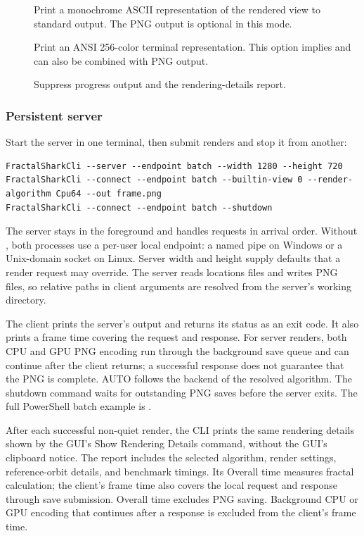 \begin{description}
  \item[]
    Print a monochrome ASCII representation of the rendered view to standard
    output. The PNG output is optional in this mode.

  \item[]
    Print an ANSI 256-color terminal representation. This option implies
     and can also be combined with PNG output.

  \item[]
    Suppress progress output and the rendering-details report.
\end{description}

\subsubsection*{Persistent server}

Start the server in one terminal, then submit renders and stop it from another:

\begin{lstlisting}
FractalSharkCli --server --endpoint batch --width 1280 --height 720
FractalSharkCli --connect --endpoint batch --builtin-view 0 --render-algorithm Cpu64 --out frame.png
FractalSharkCli --connect --endpoint batch --shutdown
\end{lstlisting}

The server stays in the foreground and handles requests in arrival order.
Without , both processes use a per-user local endpoint:
a named pipe on Windows or a Unix-domain socket on Linux. Server width and
height supply defaults that a render request may override. The server reads
locations files and writes PNG files, so relative paths in client arguments
are resolved from the server's working directory.

The client prints the server's output and returns its status as an exit code.
It also prints a frame time covering the request and response. For server
renders, both CPU and GPU PNG encoding run through the background save queue
and can continue after the client returns; a successful response does not
guarantee that the PNG is complete. AUTO follows the backend of the resolved
algorithm. The shutdown command waits for outstanding PNG saves before the
server exits. The full PowerShell batch example is
.

After each successful non-quiet render, the CLI prints the same rendering
details shown by the GUI's Show Rendering Details command, without the GUI's
clipboard notice. The report includes the selected algorithm, render settings,
reference-orbit details, and benchmark timings. Its Overall time measures
fractal calculation; the client's frame time also covers the local request and
response through save submission. Overall time excludes PNG saving. Background
CPU or GPU encoding that continues after a response is excluded from the
client's frame time.

